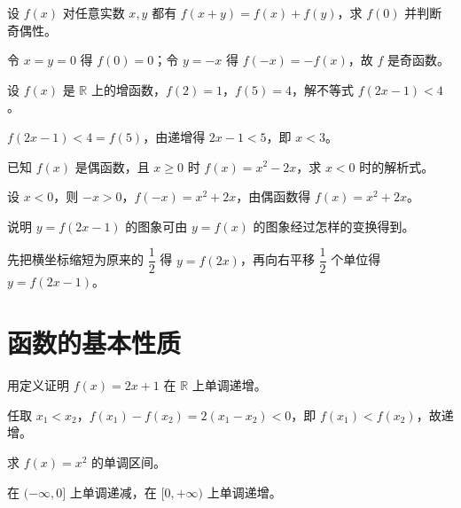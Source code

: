 \begin{problem}
设 $f(x)$ 对任意实数 $x,y$ 都有 $f(x+y)=f(x)+f(y)$，求 $f(0)$ 并判断奇偶性。
\end{problem}
\begin{solution}
令 $x=y=0$ 得 $f(0)=0$；令 $y=-x$ 得 $f(-x)=-f(x)$，故 $f$ 是奇函数。
\end{solution}

\begin{problem}
设 $f(x)$ 是 $\mathbb{R}$ 上的增函数，$f(2)=1$，$f(5)=4$，解不等式 $f(2x-1)<4$。
\end{problem}
\begin{solution}
$f(2x-1)<4=f(5)$，由递增得 $2x-1<5$，即 $x<3$。
\end{solution}

\begin{problem}
已知 $f(x)$ 是偶函数，且 $x\geq0$ 时 $f(x)=x^2-2x$，求 $x<0$ 时的解析式。
\end{problem}
\begin{solution}
设 $x<0$，则 $-x>0$，$f(-x)=x^2+2x$，由偶函数得 $f(x)=x^2+2x$。
\end{solution}

\begin{problem}
说明 $y=f(2x-1)$ 的图象可由 $y=f(x)$ 的图象经过怎样的变换得到。
\end{problem}
\begin{solution}
先把横坐标缩短为原来的 $\dfrac12$ 得 $y=f(2x)$，再向右平移 $\dfrac12$ 个单位得 $y=f(2x-1)$。
\end{solution}

\section{函数的基本性质}

\begin{problem}
用定义证明 $f(x)=2x+1$ 在 $\mathbb{R}$ 上单调递增。
\end{problem}
\begin{solution}
任取 $x_1<x_2$，$f(x_1)-f(x_2)=2(x_1-x_2)<0$，即 $f(x_1)<f(x_2)$，故递增。
\end{solution}

\begin{problem}
求 $f(x)=x^2$ 的单调区间。
\end{problem}
\begin{solution}
在 $(-\infty,0]$ 上单调递减，在 $[0,+\infty)$ 上单调递增。
\end{solution}

